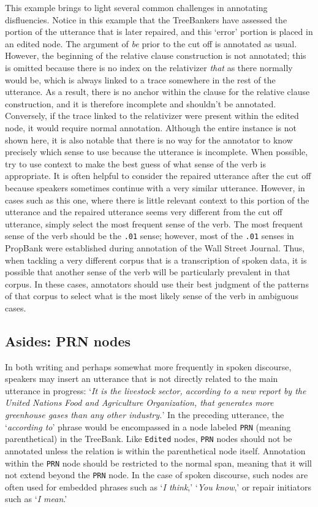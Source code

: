 \documentclass[11pt]{report}
\begin{document}
This example brings to light several common challenges in annotating disfluencies.  Notice in this example that the TreeBankers have assessed the portion of the utterance that is later repaired, and this `error' portion is placed in an edited node.  The argument of \textit{be} prior to the cut off is annotated as usual.  However, the beginning of the relative clause construction is not annotated; this is omitted because there is no index on the relativizer \textit{that} as there normally would be, which is always linked to a trace somewhere in the rest of the utterance.  As a result, there is no anchor within the clause for the relative clause construction, and it is therefore incomplete and shouldn't be annotated.  Conversely, if the trace linked to the relativizer were present within the edited node, it would require normal annotation.  Although the entire instance is not shown here, it is also notable that there is no way for the annotator to know precisely which sense to use because the utterance is incomplete.  When possible, try to use context to make the best guess of what sense of the verb is appropriate.  It is often helpful to consider the repaired utterance after the cut off because speakers sometimes continue with a very similar utterance.  However, in cases such as this one, where there is little relevant context to this portion of the utterance and the repaired utterance seems very different from the cut off utterance, simply select the most frequent sense of the verb.  The most frequent sense of the verb should be the \texttt{.01} sense; however, most of the \texttt{.01} senses in PropBank were established during annotation of the Wall Street Journal.  Thus, when tackling a very different corpus that is a transcription of spoken data, it is possible that another sense of the verb will be particularly prevalent in that corpus.  In these cases, annotators should use their best judgment of the patterns of that corpus to select what is the most likely sense of the verb in ambiguous cases.  

\subsection{Asides: PRN nodes}
In both writing and perhaps somewhat more frequently in spoken discourse, speakers may insert an utterance that is not directly related to the main utterance in progress: `\textit{It is the livestock sector, according to a new report by the United Nations Food and Agriculture Organization, that generates more greenhouse gases than any other industry.}'  In the preceding utterance, the `\textit{according to}' phrase would be encompassed in a node labeled \texttt{PRN} (meaning parenthetical) in the TreeBank.  Like \texttt{Edited} nodes, \texttt{PRN} nodes should not be annotated unless the relation is within the parenthetical node itself.  Annotation within the \texttt{PRN} node should be restricted to the normal span, meaning that it will not extend beyond the \texttt{PRN} node.  In the case of spoken discourse, such nodes are often used for embedded phrases such as `\textit{I think},' `\textit{You know},' or repair initiators such as `\textit{I mean}.'  
\end{document}
